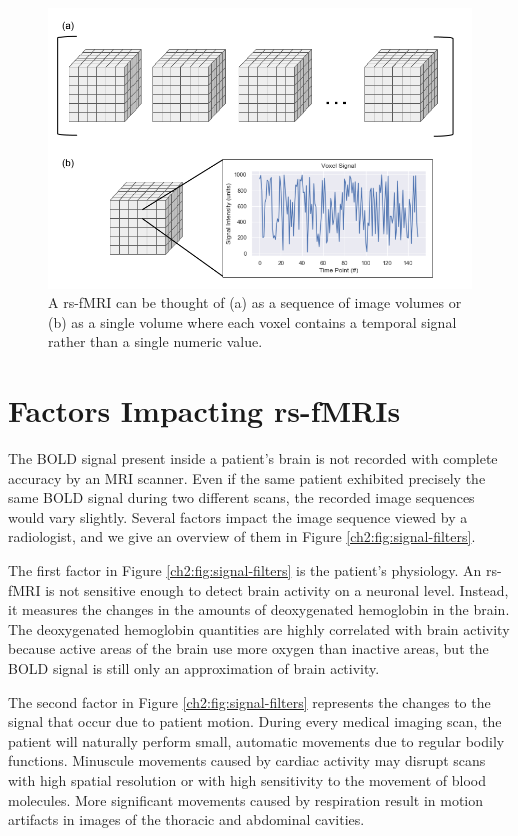 \begin{figure}
\centering
\includegraphics[width=.75\textwidth]{2/rsfMRI-views.png}
\caption{A rs-fMRI can be thought of (a) as a sequence of image volumes or (b) as a single volume where each voxel contains a temporal signal rather than a single numeric value.}
\label{ch2:fig:rsfmri-views}
\end{figure}

\clearpage

\section{Factors Impacting rs-fMRIs}

The BOLD signal present inside a patient's brain is not recorded with complete accuracy by an MRI scanner. Even if the same patient exhibited precisely the same BOLD signal during two different scans, the recorded image sequences would vary slightly. Several factors impact the image sequence viewed by a radiologist, and we give an overview of them in Figure \ref{ch2:fig:signal-filters}. 

The first factor in Figure \ref{ch2:fig:signal-filters} is the patient's physiology. An rs-fMRI is not sensitive enough to detect brain activity on a neuronal level. Instead, it measures the changes in the amounts of deoxygenated hemoglobin in the brain. The deoxygenated hemoglobin quantities are highly correlated with brain activity because active areas of the brain use more oxygen than inactive areas, but the BOLD signal is still only an approximation of brain activity.

The second factor in Figure \ref{ch2:fig:signal-filters} represents the changes to the signal that occur due to patient motion.
During every medical imaging scan, the patient will naturally perform small, automatic movements due to regular bodily functions. Minuscule movements caused by cardiac activity may disrupt scans with high spatial resolution or with high sensitivity to the movement of blood molecules. More significant movements caused by respiration result in motion artifacts in images of the thoracic and abdominal cavities. 

